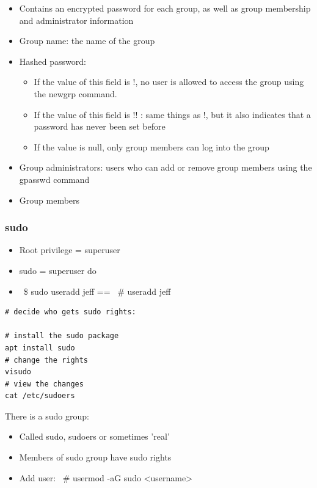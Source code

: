 \documentclass{article}
\begin{document}
\begin{itemize}
    \item Contains an encrypted password for each group, as well as group membership and administrator information
    \item Group name: the name of the group
    \item Hashed password: 
    \begin{itemize}
        \item If the value of this field is !, no user is allowed to access the group using the newgrp command. 
        \item If the value of this field is !! : same things as !, but it also indicates that a password has never been set before
        \item If the value is null, only group members can log into the group
    \end{itemize}
    \item Group administrators: users who can add or remove group members using the gpasswd command
    \item Group members
\end{itemize}

\subsubsection{sudo}

\begin{itemize}
    \item Root privilege = superuser
    \item sudo = superuser do
    \item ~\$ sudo useradd jeff == ~\# useradd jeff
\end{itemize}

\begin{verbatim}
# decide who gets sudo rights:

# install the sudo package
apt install sudo
# change the rights
visudo
# view the changes
cat /etc/sudoers
\end{verbatim}

There is a sudo group:

\begin{itemize}
    \item Called sudo, sudoers or sometimes 'real'
    \item Members of sudo group have sudo rights
    \item Add user: ~\# usermod -aG sudo <username>
\end{itemize}
\end{document}
